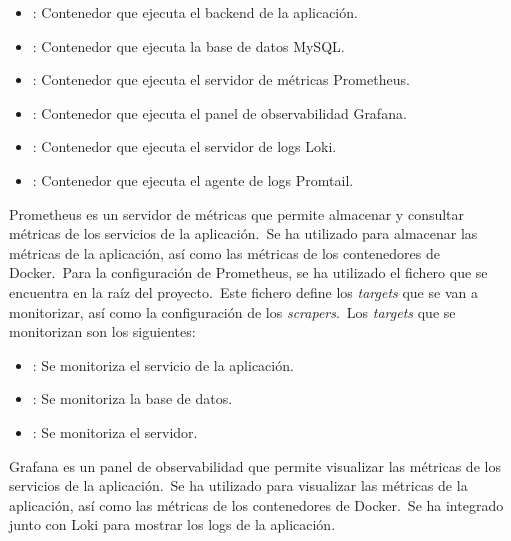 \begin{itemize}
	\item {}: Contenedor que ejecuta el backend de la aplicación.
	\item {}: Contenedor que ejecuta la base de datos MySQL\@.
	\item {}: Contenedor que ejecuta el servidor de métricas
	Prometheus.
	\item {}: Contenedor que ejecuta el panel de observabilidad
	Grafana.
	\item {}: Contenedor que ejecuta el servidor de logs Loki.
	\item {}: Contenedor que ejecuta el agente de logs
	Promtail.
\end{itemize}

Prometheus es un servidor de métricas que permite almacenar y consultar métricas de los servicios de la aplicación.\ Se
ha utilizado para almacenar las métricas de la aplicación, así como las métricas de los contenedores de Docker.\ Para
la configuración de Prometheus, se ha utilizado el fichero  que se encuentra en la raíz del
proyecto.\ Este fichero define los \textit{targets} que se van a monitorizar, así como la configuración de los
\textit{scrapers}.\ Los \textit{targets} que se monitorizan son los siguientes:

\begin{itemize}
	\item {}: Se monitoriza el servicio de la aplicación.
	\item {}: Se monitoriza la base de datos.
	\item {}: Se monitoriza el servidor.
\end{itemize}

Grafana es un panel de observabilidad que permite visualizar las métricas de los servicios de la aplicación.\ Se ha
utilizado para visualizar las métricas de la aplicación, así como las métricas de los contenedores de Docker.\ Se
ha integrado junto con Loki para mostrar los logs de la aplicación.

